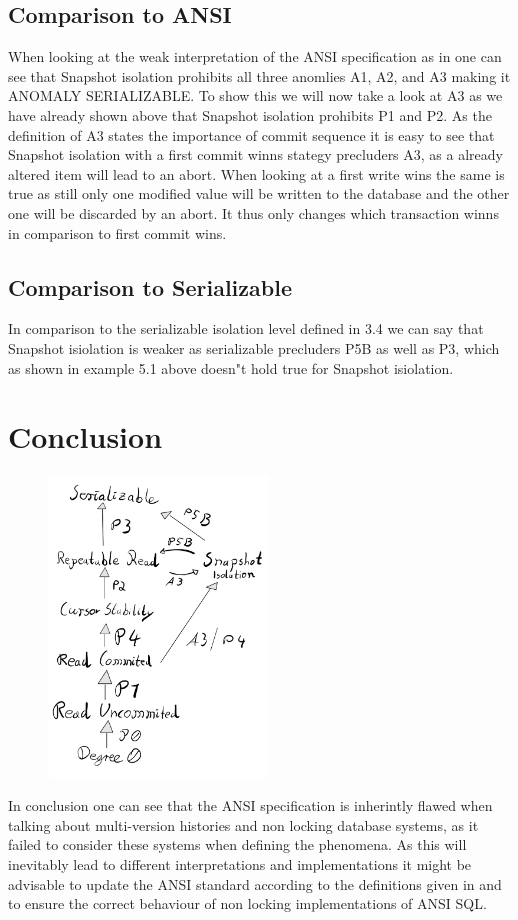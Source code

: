 \documentclass[sigconf, review=true]{acmart}
\begin{document}
\subsection{Comparison to ANSI}
When looking at the weak interpretation of the ANSI specification as in \cite{Adya_Liskov_O_Neil_2000}
one can see that Snapshot isolation prohibits all three anomlies A1, A2, and A3 making it ANOMALY SERIALIZABLE.
To show this we will now take a look at A3 as we have already shown above that Snapshot isolation prohibits P1 and P2.
As the definition of A3 states the importance of commit sequence it is easy to see that Snapshot isolation with a first commit winns
stategy precluders A3, as a already altered item will lead to an abort.
When looking at a first write wins the same is true as still only one modified value will
be written to the database and the other one will be discarded by an abort. It thus only changes
which transaction winns in comparison to first commit wins.
\subsection{Comparison to Serializable}
In comparison to the serializable isolation level defined in 3.4 we can say that Snapshot isiolation is
weaker as serializable precluders P5B as well as P3, which as shown in example 5.1 above doesn"t hold true
for Snapshot isiolation.
\section{Conclusion}
\includegraphics[width=8cm, height=8cm]{iso_lvl_dia.png}

In conclusion one can see that the ANSI specification is inherintly flawed when talking
about multi-version histories and non locking database systems, as it failed to consider
these systems when defining the phenomena. As this will inevitably lead to different interpretations
and implementations it might be advisable to update the ANSI standard
according to the definitions given in \cite{Adya_Liskov_O_Neil_2000} and \cite{Berenson_Bernstein_Gray_Melton_O_Neil_O_Neil_1995}
to ensure the correct behaviour of non locking implementations of ANSI SQL.


\end{document}
